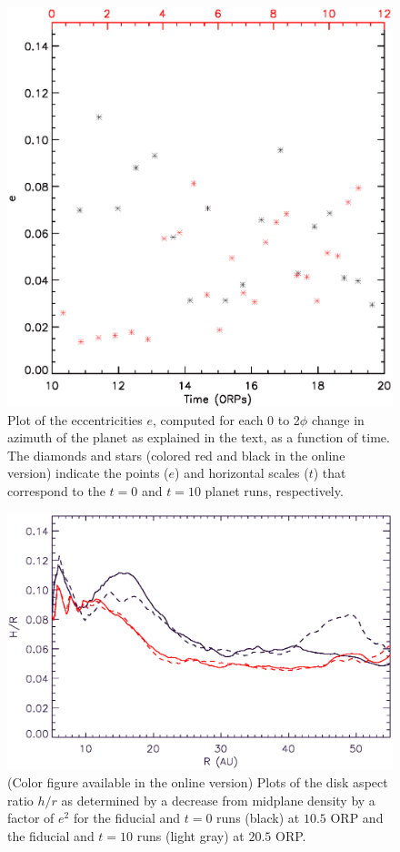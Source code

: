 \documentclass[12pt,manuscript,authoryear]{aastex}
\begin{document}
\begin{figure}[t]
\center
\includegraphics[width=12cm]{Figures/planete.eps}
\caption{Plot of the eccentricities $e$, computed for each 0 to 2$\phi$ change in azimuth of the planet as explained in
  the text, as a function of time. The diamonds and stars (colored red and black in the online version) indicate the
  points ($e$) and horizontal scales ($t$) that correspond to the $t = 0$ and $t = 10$ planet runs, respectively.}
\label{fig:e}
\end{figure}

\begin{figure}[t]
\center
\includegraphics[width=12cm]{Figures/hr_migration.eps}
\caption{(Color figure available in the online version) Plots of the disk aspect ratio $h/r$ as determined by a decrease
  from midplane density by a factor of $e^2$ for the fiducial and $t=0$ runs (black) at $10.5$ ORP and the fiducial and
  $t=10$ runs (light gray) at $20.5$ ORP.}
\label{fig:hr}
\end{figure}


\label{lastpage}
\end{document}
